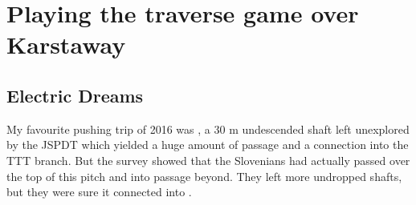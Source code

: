 
\begin{marginfigure}
\end{marginfigure}

\section{Playing the traverse game over Karstaway}

\subsection{Electric Dreams}

My favourite pushing trip of 2016 was , a 30 m undescended shaft left unexplored by the JSPDT  which yielded a huge amount of passage and a connection into the TTT branch. But the survey showed that the Slovenians had actually passed over the top of this pitch and into passage beyond. They left more undropped shafts, but they were sure it connected into .


